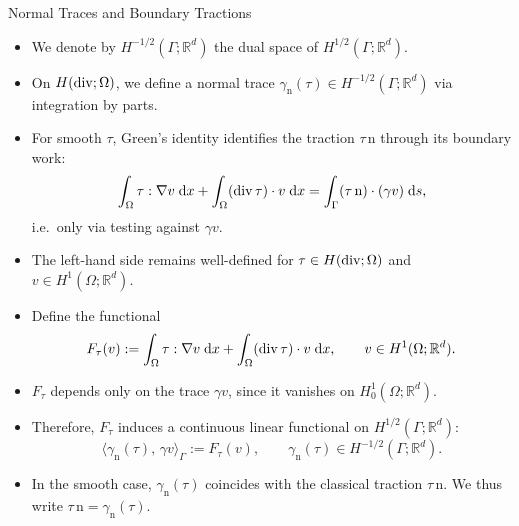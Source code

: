 \documentclass[10pt,aspectratio=169]{beamer}
\def\R{{\mathbb R}}
\def\d{{\mathrm{d}}}
\def\dx{{\d x}}
\def\ds{{\d s}}
\newcommand{\diver}{\operatornamewithlimits{div}}
\begin{document}
\begin{frame}{Normal Traces and Boundary Tractions}
	\begin{itemize}
		\item We denote by $H^{-1/2}(\Gamma;\R^d)$ the dual space of $H^{1/2}(\Gamma;\R^d)$.
		\item On $H(\diver;\Omega)$, we define a normal trace $\gamma_{\mathrm n}(\tau)\in H^{-1/2}(\Gamma;\R^d)$ via integration by parts.
		\item For smooth $\tau$, Green's identity identifies the traction $\tau\,\mathrm n$ through its boundary work:
		      \begin{equation*}
			      \int_\Omega \tau:\nabla v\;\dx+\int_\Omega (\diver\tau)\cdot v\;\dx
			      =
			      \int_\Gamma (\tau\,\mathrm n)\cdot (\gamma v)\;\ds,
		      \end{equation*}
		      i.e.\ only via testing against $\gamma v$.
		\item The left-hand side remains well-defined for $\tau\in H(\diver;\Omega)$ and $v\in H^1(\Omega;\R^d)$.
		\item Define the functional
		      \begin{equation*}
			      F_\tau(v):=\int_\Omega \tau:\nabla v\;\dx+\int_\Omega (\diver\tau)\cdot v\;\dx,
			      \qquad v\in H^1(\Omega;\R^d).
		      \end{equation*}
		\item $F_\tau$ depends only on the trace $\gamma v$, since it vanishes on $H^1_0(\Omega;\R^d)$.
		\item Therefore, $F_\tau$ induces a continuous linear functional on $H^{1/2}(\Gamma;\R^d)$:
		      \begin{equation*}
			      \langle \gamma_{\mathrm n}(\tau),\,\gamma v\rangle_\Gamma := F_\tau(v),
			      \qquad \gamma_{\mathrm n}(\tau)\in H^{-1/2}(\Gamma;\R^d).
		      \end{equation*}
		\item In the smooth case, $\gamma_{\mathrm n}(\tau)$ coincides with the classical traction $\tau\,\mathrm n$. We thus write $\tau\,\mathrm{n} = \gamma_{\mathrm n}(\tau)$.
	\end{itemize}
\end{frame}
\end{document}
